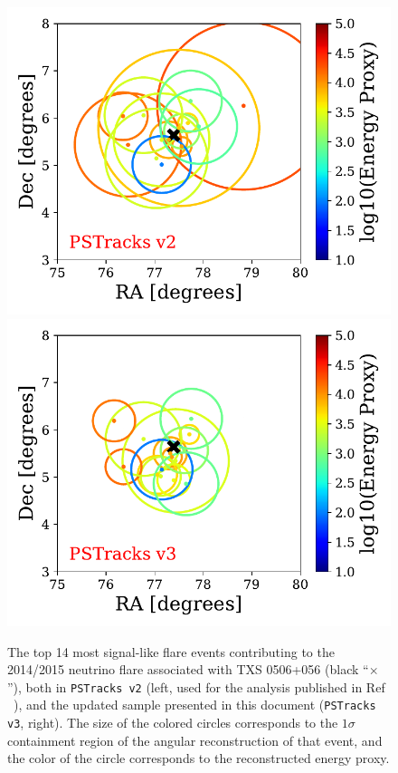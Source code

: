 \documentclass[aps,10pt,prd,twocolumn,floats,letterpaper,showpacs,nofootinbib,bibnotes,notitlepage,superscriptaddress,floatfix]{revtex4-1}
\newcommand{\MA}[1]{{\color{black}#1}}
\begin{document}
\begin{figure}[p]
\centering
\includegraphics[width=.45\linewidth]{./TXSCheckPlots/PSTracksv2evtplot.pdf}\hspace{0.2in}\includegraphics[width=.45\linewidth]{./TXSCheckPlots/PSTracksv3evtplot.pdf}
\caption[]{The top 14 most signal-like flare events contributing to the 2014/2015 neutrino flare associated with TXS 0506+056 (black ``$\times$''), both in \MA{\tt PSTracks v2} (left, used for the analysis published in Ref ~\cite{IceCube:2018cha}), and the updated sample presented in this document ({\tt PSTracks v3}, right). The size of the colored circles corresponds to the $1\sigma$ containment region of the angular reconstruction of that event, and the color of the circle corresponds to the reconstructed energy proxy.}\label{fig:TXSEvtsCompare}
\end{figure}
\end{document}
